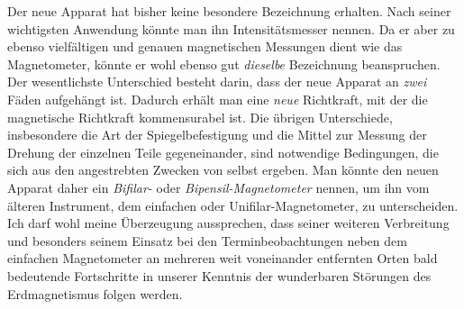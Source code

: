 Der neue Apparat hat bisher keine besondere Bezeichnung erhalten. Nach seiner wichtigsten Anwendung könnte man ihn Intensitätsmesser nennen. Da er aber zu ebenso vielfältigen und genauen magnetischen Messungen dient wie das Magnetometer, könnte er wohl ebenso gut \textit{dieselbe} Bezeichnung beanspruchen. Der wesentlichste Unterschied besteht darin, dass der neue Apparat an \textit{zwei} Fäden aufgehängt ist. Dadurch erhält man eine \textit{neue} Richtkraft, mit der die magnetische Richtkraft kommensurabel ist. Die übrigen Unterschiede, insbesondere die Art der Spiegelbefestigung und die Mittel zur Messung der Drehung der einzelnen Teile gegeneinander, sind notwendige Bedingungen, die sich aus den angestrebten Zwecken von selbst ergeben. Man könnte den neuen Apparat daher ein \textit{Bifilar-} oder \textit{Bipensil-Magnetometer} nennen, um ihn vom älteren Instrument, dem einfachen oder Unifilar-Magnetometer, zu unterscheiden. Ich darf wohl meine Überzeugung aussprechen, dass seiner weiteren Verbreitung und besonders seinem Einsatz bei den Terminbeobachtungen neben dem einfachen Magnetometer an mehreren weit voneinander entfernten Orten bald bedeutende Fortschritte in unserer Kenntnis der wunderbaren Störungen des Erdmagnetismus folgen werden.

